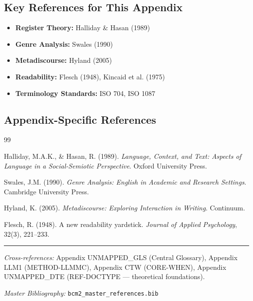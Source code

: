 \subsection{Key References for This Appendix}

\begin{itemize}[nosep]
    \item \textbf{Register Theory:} Halliday \& Hasan (1989)
    \item \textbf{Genre Analysis:} Swales (1990)
    \item \textbf{Metadiscourse:} Hyland (2005)
    \item \textbf{Readability:} Flesch (1948), Kincaid et al. (1975)
    \item \textbf{Terminology Standards:} ISO 704, ISO 1087
\end{itemize}

\subsection{Appendix-Specific References}

\begin{thebibliography}{99}

 Halliday, M.A.K., \& Hasan, R. (1989).
\textit{Language, Context, and Text: Aspects of Language in a Social-Semiotic Perspective}.
Oxford University Press.

 Swales, J.M. (1990).
\textit{Genre Analysis: English in Academic and Research Settings}.
Cambridge University Press.

 Hyland, K. (2005).
\textit{Metadiscourse: Exploring Interaction in Writing}.
Continuum.

 Flesch, R. (1948).
A new readability yardstick.
\textit{Journal of Applied Psychology}, 32(3), 221--233.

\end{thebibliography}



\vspace{1em}
\hrule
\vspace{0.5em}

\noindent\textit{Cross-references:}
Appendix UNMAPPED_GLS (Central Glossary),
Appendix LLM1 (METHOD-LLMMC),
Appendix CTW (CORE-WHEN),
Appendix UNMAPPED_DTE (REF-DOCTYPE --- theoretical foundations).

\noindent\textit{Master Bibliography:} \texttt{bcm2\_master\_references.bib}


